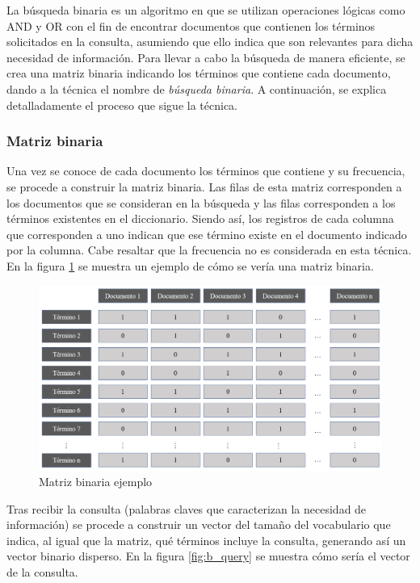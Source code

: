 La búsqueda binaria es un algoritmo en que se utilizan operaciones lógicas como AND y OR con el fin de encontrar documentos que contienen los términos solicitados en la consulta, asumiendo que ello indica que son relevantes para dicha necesidad de información. Para llevar a cabo la búsqueda de manera eficiente, se crea una matriz binaria indicando los términos que contiene cada documento, dando a la técnica el nombre de \textit{búsqueda binaria}. A continuación, se explica detalladamente el proceso que sigue la técnica.

\subsubsection{Matriz binaria}
Una vez se conoce de cada documento los términos que contiene y su frecuencia, se procede a construir la matriz binaria. Las filas de esta matriz corresponden a los documentos que se consideran en la búsqueda y las filas corresponden a los términos existentes en el diccionario. Siendo así, los registros de cada columna que corresponden a uno indican que ese término existe en el documento indicado por la columna. Cabe resaltar que la frecuencia no es considerada en esta técnica. En la figura \ref{fig:b_matrix} se muestra un ejemplo de cómo se vería una matriz binaria.\\

\begin{figure}[H]
    \centering
    \includegraphics[scale=0.5]{doc/images/BS/b_matrix.PNG}
    \caption{Matriz binaria ejemplo}
    \label{fig:b_matrix}
\end{figure}

Tras recibir la consulta (palabras claves que caracterizan la necesidad de información) se procede a construir un vector del tamaño del vocabulario que indica, al igual que la matriz, qué términos incluye la consulta, generando así un vector binario disperso. En la figura \ref{fig:b_query} se muestra cómo sería el vector de la consulta.\\

